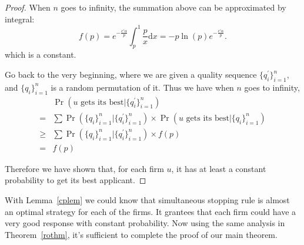 \begin{proof}
When $n$ goes to infinity, the summation above can be approximated by integral:
$$f(p) = e^{-\frac{c' \alpha}{p}}\int_{p}^{1} \frac{p}{x} \mathrm{d}x = -p\ln(p)e^{-\frac{c' \alpha}{p}}.$$
which is a constant.

Go back to the very beginning, where we are given a quality sequence $\{q_i^\prime\}_{i=1}^n$,
and $\{q_i\}_{i=1}^n$ is a random permutation of it. Thus we have when $n$ goes to infinity,
\begin{align*}
    & \Pr(u\text{ gets its best} | \{q_i^\prime\}_{i=1}^n) \\
    = &\sum \Pr (\{q_i\}_{i=1}^n | \{q_i^\prime\}_{i=1}^n) \times \Pr(u\text{ gets its best} | \{q_i\}_{i=1}^n) \\
    \ge & \sum \Pr (\{q_i\}_{i=1}^n | \{q_i^\prime\}_{i=1}^n) \times f(p) \\
    = & f(p)
\end{align*}

Therefore we have shown that, for each firm $u$, it has at least a constant probability to get its best applicant.
\end{proof}

With Lemma~\ref{cplem} we could know that simultaneous stopping rule is almost an optimal
strategy for each of the firms. 
It grantees that each firm could have a very good response with constant probability.
Now using the same analysis in Theorem~\ref{rothm},
it's sufficient to complete the proof of our main theorem.



%
%
%
%

